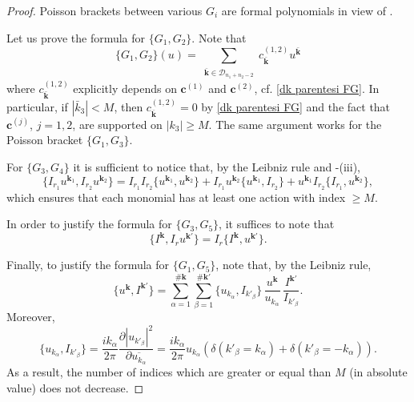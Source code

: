 \documentclass[a4paper,10pt,reqno]{article}
\theoremstyle{definition}
\theoremstyle{plain}
\theoremstyle{plain}
\theoremstyle{definition}
\theoremstyle{plain}
\theoremstyle{plain}
\theoremstyle{plain}
\theoremstyle{definition}
\theoremstyle{definition}
\def \pa{{\partial}}
\def \k{\bm{k}}
\begin{document}
\begin{proof}
Poisson brackets between various $G_i$ are formal polynomials in view of 
.

Let us prove the formula for $\{G_1,G_2\}$. Note that 
\[
\{G_1,G_2\}(u)= \sum_{ \substack{ \bar{\k} \in \mathcal{D}_{n_1+n_2-2}}} c_{\bar{\k} }^{(1,2)} u^{\bar{\k}} 
\]
where $c_{\bar{\k} }^{(1,2)}$ explicitly depends on $\bm{c}^{(1)}$ and $\bm{c}^{(2)}$, cf. \eqref{dk parentesi FG}. 
In particular, if $|\bar{k}_3|<M$, then $c_{\bar{\k} }^{(1,2)} =0$ by \eqref{dk parentesi FG} and the fact that $\bm{c}^{(j)}$, $j=1,2$, are supported  on $|k_3|\geq M$. The same argument works for the Poisson bracket $\{G_1,G_3\}$.


For $\{ G_3,G_4 \}$ it is sufficient to notice that, by the Leibniz rule and -(iii),
\[
\{ I_{r_1} u^{\k_1} , I_{r_2} u^{\k_2} \} = I_{r_1} I_{r_2} \{ u^{\k_1} , u^{\k_2} \} + I_{r_1} u^{\k_2} \{ u^{\k_1} , I_{r_2} \} + u^{\k_1} I_{r_2} \{ I_{r_1} , u^{\k_2} \},
\]
which ensures that each monomial has at least one action with index $ \ge M.$

In order to justify the formula for $\{G_3,G_5\}$, it suffices to note that
\[
\{ I^{\k} , I_r u^{\k'} \} = I_r \{ I^{\k} , u^{\k'} \}.
\]

Finally, to justify the formula for $\{G_1,G_5\}$, note that, by the Leibniz rule, 
\[
\{ u^{\k}, I^{\k'}\} = \sum_{\alpha=1}^{\#\k} \sum_{\beta=1}^{\#\k'} \{ u_{k_{\alpha}}, I_{k'_{\beta}}\} \, \frac{u^{\k}}{u_{k_{\alpha}}} \, \frac{I^{\k'}}{I_{k'_{\beta}}}.
\]
Moreover, 
\[
\{ u_{k_{\alpha}} , I_{k'_{\beta}} \} = \frac{ik_{\alpha}}{2\pi} \frac{\pa |u_{k'_{\beta}}|^2}{\pa \overline{u_{k_{\alpha}}}} = \frac{i{k_\alpha}}{2\pi} u_{k_{\alpha}}( \delta(k'_{\beta}=k_{\alpha}) + \delta(k'_{\beta}=-k_{\alpha}) ).
\]
As a result, the number of indices which are greater or equal than $M$ (in absolute value) does not decrease.
\end{proof}
\end{document}
